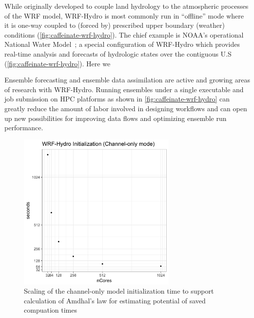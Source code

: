 While originally developed to couple land hydrology to the atmospheric processes of
the WRF model, WRF-Hydro is most commonly run in ``offline'' mode where it is one-way
coupled to (forced by) prescribed upper boundary (weather)
conditions (\ref{fig:caffeinate-wrf-hydro}). The chief example is NOAA's operational
National Water Model~\cite{noaa2016}; a special configuration of
WRF-Hydro which provides real-time analysis and forecasts of
hydrologic states over the contiguous U.S (\ref{fig:caffeinate-wrf-hydro}). Here we

Ensemble forecasting and ensemble data assimilation are active and
growing areas of research with WRF-Hydro. Running ensembles under a
single executable and job submission on HPC platforms as shown in
\ref{fig:caffeinate-wrf-hydro} can greatly reduce the amount
of labor involved in designing workflows and can open up new
possibilities for improving data flows and optimizing ensemble run
performance.

\begin{figure}
\includegraphics[width=0.7\textwidth]{figures/init_timing_linear.png}
\vspace{-7pt}
\caption{Scaling of the channel-only model initialization time to
  support calculation of Amdhal's law for estimating potential of
  saved compuation times \label{fig:wrf-hydro-init-scaling}}
\end{figure}

